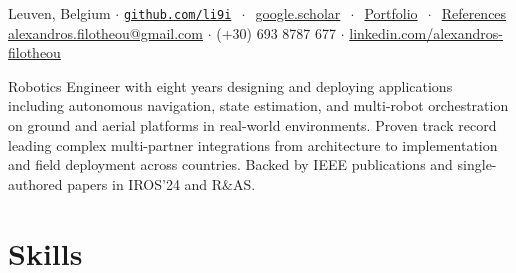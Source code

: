 \documentclass[a4paper,10pt,twoside]{article}
\begin{document}

\par{\bigskip\par}

\begin{center}
\vspace{-0.5em}
  {\small
   Leuven, Belgium $\cdot$
  \href{https://github.com/li9i/}{\texttt{github.com/li9i}} $\ \cdot\ $ \href{https://scholar.google.com/citations?hl=en&view_op=list_works&gmla=AKzYXQ2ZNs_wAOy2e75F24-NJ0AGC7eeo8hugORYe3HG61yfKTR1H8vsWVf-C05DUq2qxvo9xqCvr6kF3qWTB4dIM-IJ&user=9_hI4hMAAAAJ}{google.scholar} $\ \cdot\ $ \href{https://docs.google.com/viewerng/viewer?url=https://raw.githubusercontent.com/li9i/portfolio/master/portfolio.pdf}{Portfolio} $\ \cdot \ $ \href{https://docs.google.com/viewerng/viewer?url=https://raw.githubusercontent.com/li9i/cv/master/references/references_alexandros_filotheou.pdf}{References} \\
  \href{mailto:alexandros.filotheou@gmail.com}{alexandros.filotheou@gmail.com} $\cdot$ (+30) 693 8787 677 $\cdot$ \href{https://www.linkedin.com/in/alexandros-filotheou/}{linkedin.com/alexandros-filotheou}
  }
\end{center}\vspace{-0.75em}

\begin{gg_box} \small
Robotics Engineer with eight years designing and deploying applications including autonomous navigation, state estimation, and multi-robot orchestration on ground and aerial platforms in real-world environments. Proven track record leading complex multi-partner integrations from architecture to implementation and field deployment across countries. Backed by IEEE publications and single-authored papers in IROS'24 and R\&AS.
\end{gg_box}

\section{\textbf{Skills}}\verticalspacebetweensectionandcontent\vspace{-0.75em}
\end{document}
